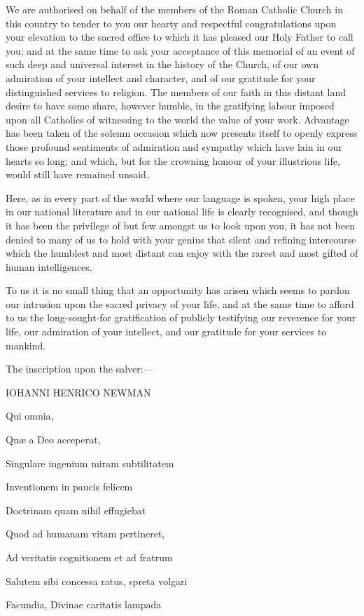 We are authorised on behalf of the members of the Roman Catholic
Church in this country to tender to you our hearty and respectful
congratulations upon your elevation to the sacred office to which it has pleased our Holy Father to call you; and at the same time
to ask your acceptance of this memorial of an event of such deep and
universal interest in the history of the Church, of our own admiration
of your intellect and character, and of our gratitude for your
distinguished services to religion. The members of our faith in this
distant land desire to have some share, however humble, in the
gratifying labour imposed upon all Catholics of witnessing to the
world the value of your work. Advantage has been taken of the solemn
occasion which now presents itself to openly express those profound
sentiments of admiration and sympathy which have lain in our hearts so
long; and which, but for the crowning honour of your illustrious life,
would still have remained unsaid.

Here, as in every part of the world where our language is spoken,
your high place in our national literature and in our national life is
clearly recognised, and though it has been the privilege of but few
amongst us to look upon you, it has not been denied to many of us to
hold with your genius that silent and refining intercourse which the
humblest and most distant can enjoy with the rarest and most gifted of
human intelligences.

To us it is no small thing that an opportunity has arisen which
seems to pardon our intrusion upon the sacred privacy of your life,
and at the same time to afford to us the long-sought-for
gratification of publicly testifying our reverence for your life, our
admiration of your intellect, and our gratitude for your services to
mankind.

The inscription upon the salver:—

IOHANNI HENRICO NEWMAN

Qui omnia,

Quæ a Deo acceperat,

Singulare ingenium miram subtilitatem

Inventionem in paucis felicem

Doctrinam quam nihil effugiebat

Quod ad humanam vitam pertineret,

Ad veritatis cognitionem et ad fratrum

Salutem sibi concessa ratus, spreta volgari

Facundia, Divinae caritatis lampada

